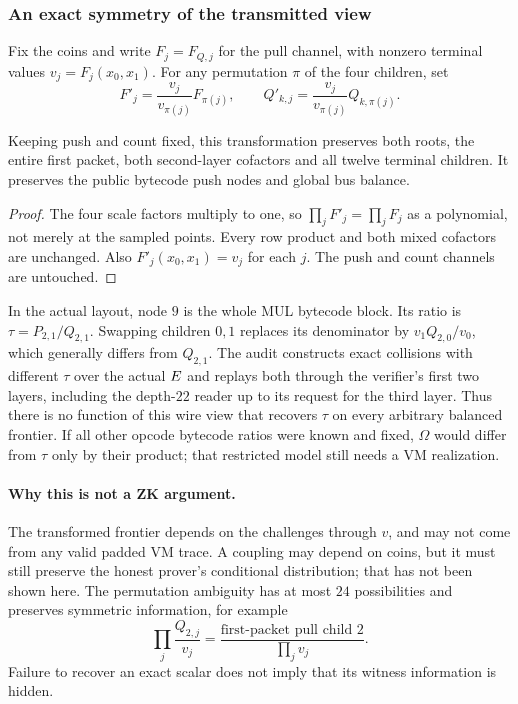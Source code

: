 \subsubsection{An exact symmetry of the transmitted view}

Fix the coins and write $F_j=F_{Q,j}$ for the pull channel, with nonzero terminal values $v_j=F_j(x_0,x_1)$. For any permutation $\pi$ of the four children, set
\[
 F'_j=\frac{v_j}{v_{\pi(j)}}F_{\pi(j)},\qquad
 Q'_{k,j}=\frac{v_j}{v_{\pi(j)}}Q_{k,\pi(j)}.
\]

\begin{proposition}
Keeping push and count fixed, this transformation preserves both roots, the entire first packet, both second-layer cofactors and all twelve terminal children. It preserves the public bytecode push nodes and global bus balance.
\end{proposition}
\begin{proof}
The four scale factors multiply to one, so $\prod_jF'_j=\prod_jF_j$ as a polynomial, not merely at the sampled points. Every row product and both mixed cofactors are unchanged. Also $F'_j(x_0,x_1)=v_j$ for each $j$. The push and count channels are untouched.
\end{proof}

In the actual layout, node $9$ is the whole MUL bytecode block. Its ratio is $\tau=P_{2,1}/Q_{2,1}$. Swapping children $0,1$ replaces its denominator by $v_1Q_{2,0}/v_0$, which generally differs from $Q_{2,1}$. The audit constructs exact collisions with different $\tau$ over the actual $E$ and replays both through the verifier's first two layers, including the depth-$22$ reader up to its request for the third layer. Thus there is no function of this wire view that recovers $\tau$ on every arbitrary balanced frontier. If all other opcode bytecode ratios were known and fixed, $\Omega$ would differ from $\tau$ only by their product; that restricted model still needs a VM realization.

\paragraph{Why this is not a ZK argument.} The transformed frontier depends on the challenges through $v$, and may not come from any valid padded VM trace. A coupling may depend on coins, but it must still preserve the honest prover's conditional distribution; that has not been shown here. The permutation ambiguity has at most $24$ possibilities and preserves symmetric information, for example
\[
 \prod_j\frac{Q_{2,j}}{v_j}
   =\frac{\text{first-packet pull child }2}{\prod_jv_j}.
\]
Failure to recover an exact scalar does not imply that its witness information is hidden.

